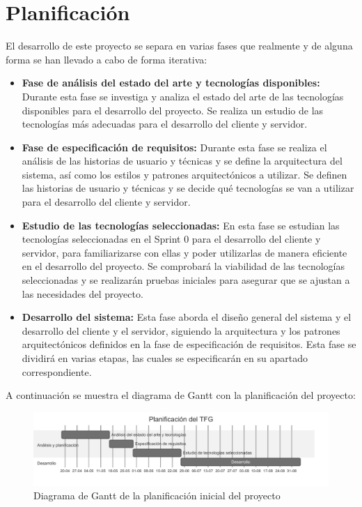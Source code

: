 \section{Planificación}
El desarrollo de este proyecto se separa en varias fases que realmente y de alguna forma se han llevado a cabo de forma iterativa:
\begin{itemize}
    \item \textbf{Fase de análisis del estado del arte y tecnologías disponibles:} Durante esta fase se investiga y analiza el estado del arte de las tecnologías disponibles para el desarrollo del proyecto. Se realiza un estudio de las tecnologías más adecuadas para el desarrollo del cliente y servidor.
    \item \textbf{Fase de especificación de requisitos:} Durante esta fase se realiza el análisis de las historias de usuario y técnicas y se define la arquitectura del sistema, así como los estilos y patrones arquitectónicos a utilizar. Se definen las historias de usuario y técnicas y se decide qué tecnologías se van a utilizar para el desarrollo del cliente y servidor.
    \item \textbf{Estudio de las tecnologías seleccionadas:} En esta fase se estudian las tecnologías seleccionadas en el Sprint 0 para el desarrollo del cliente y servidor, para familiarizarse con ellas y poder utilizarlas de manera eficiente en el desarrollo del proyecto. Se comprobará la viabilidad de las tecnologías seleccionadas y se realizarán pruebas iniciales para asegurar que se ajustan a las necesidades del proyecto.
    \item \textbf{Desarrollo del sistema:} Esta fase aborda el diseño general del sistema y el desarrollo del cliente y el servidor, siguiendo la arquitectura y los patrones arquitectónicos definidos en la fase de especificación de requisitos. Esta fase se dividirá en varias etapas, las cuales se especificarán en su apartado correspondiente.
\end{itemize}

A continuación se muestra el diagrama de Gantt con la planificación del proyecto:
\begin{figure}[H]
    \begin{center}
        \includegraphics[width=\textwidth]{assets/planificacion-inicial.png}
    \end{center}
    \caption{Diagrama de Gantt de la planificación inicial del proyecto}\label{fig:planificacion-inicial}
\end{figure}


